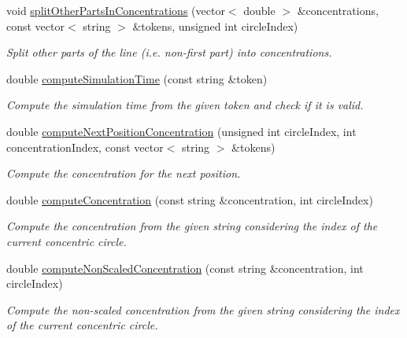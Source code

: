 \begin{DoxyCompactItemize}
void \hyperlink{classmultiscale_1_1video_1_1PolarCsvToInputFilesConverter_a84994d623303296509326707fa397f29}{split\-Other\-Parts\-In\-Concentrations} (vector$<$ double $>$ \&concentrations, const vector$<$ string $>$ \&tokens, unsigned int circle\-Index)
\begin{DoxyCompactList}\small\item\em \-Split other parts of the line (i.\-e. non-\/first part) into concentrations. \end{DoxyCompactList}\item 
double \hyperlink{classmultiscale_1_1video_1_1PolarCsvToInputFilesConverter_a3f811086d08d1665548af54e8bd50654}{compute\-Simulation\-Time} (const string \&token)
\begin{DoxyCompactList}\small\item\em \-Compute the simulation time from the given token and check if it is valid. \end{DoxyCompactList}\item 
double \hyperlink{classmultiscale_1_1video_1_1PolarCsvToInputFilesConverter_a393e66a46463bf557ccf318ddcf14d3a}{compute\-Next\-Position\-Concentration} (unsigned int circle\-Index, int concentration\-Index, const vector$<$ string $>$ \&tokens)
\begin{DoxyCompactList}\small\item\em \-Compute the concentration for the next position. \end{DoxyCompactList}\item 
double \hyperlink{classmultiscale_1_1video_1_1PolarCsvToInputFilesConverter_adec57e72f9f321cd9b36317b2aa3ac38}{compute\-Concentration} (const string \&concentration, int circle\-Index)
\begin{DoxyCompactList}\small\item\em \-Compute the concentration from the given string considering the index of the current concentric circle. \end{DoxyCompactList}\item 
double \hyperlink{classmultiscale_1_1video_1_1PolarCsvToInputFilesConverter_a3c9fd506cbe4d0881ed3c234492d2432}{compute\-Non\-Scaled\-Concentration} (const string \&concentration, int circle\-Index)
\begin{DoxyCompactList}\small\item\em \-Compute the non-\/scaled concentration from the given string considering the index of the current concentric circle. \end{DoxyCompactList}\item 

\end{DoxyCompactItemize}
